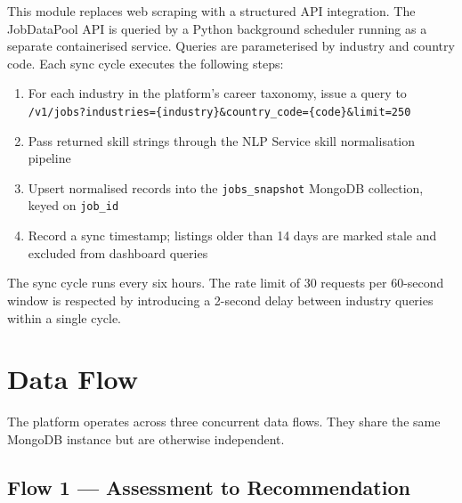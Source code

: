 This module replaces web scraping with a structured API integration. The
JobDataPool API is queried by a Python background scheduler running as a
separate containerised service. Queries are parameterised by industry and
country code. Each sync cycle executes the following steps:

\begin{enumerate}
  \item For each industry in the platform's career taxonomy, issue a query to
        \texttt{/v1/jobs?industries=\{industry\}\&country\_code=\{code\}\&limit=250}
  \item Pass returned skill strings through the NLP Service skill normalisation
        pipeline
  \item Upsert normalised records into the \texttt{jobs\_snapshot} MongoDB
        collection, keyed on \texttt{job\_id}
  \item Record a sync timestamp; listings older than 14 days are marked stale
        and excluded from dashboard queries
\end{enumerate}

The sync cycle runs every six hours. The rate limit of 30 requests per
60-second window is respected by introducing a 2-second delay between industry
queries within a single cycle.

\section{Data Flow}
\label{sec:dataflow}

The platform operates across three concurrent data flows. They share the same
MongoDB instance but are otherwise independent.

\subsection*{Flow 1 --- Assessment to Recommendation}

